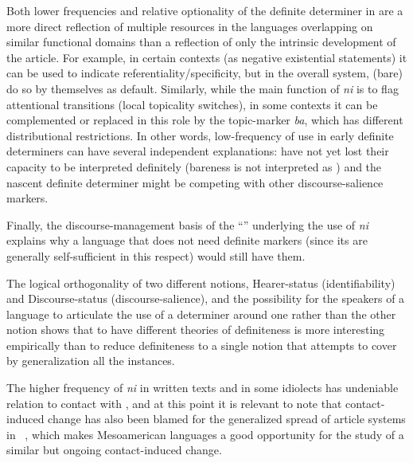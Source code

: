 \documentclass[output=paper
,modfonts
,nonflat]{langsci/langscibook}
\begin{document}
Both lower frequencies and relative optionality of the definite determiner in  are a more direct reflection of multiple resources in the languages overlapping on similar functional domains than a reflection of only the intrinsic development of the article. For example, in certain contexts (as negative existential statements) it can be used to indicate referentiality/specificity, but in the overall system, (bare)  do so by themselves as default. Similarly, while the main function of \textit{ni} is to flag attentional transitions (local topicality switches), in some contexts it can be complemented or replaced in this role by the topic-marker \textit{ba}, which has different distributional restrictions. In other words, low-frequency of use in early definite determiners can have several independent explanations:  have not yet lost their capacity to be interpreted definitely (bareness is not interpreted as ) and the nascent definite determiner might be competing with other discourse-salience markers.

Finally, the discourse-management basis of the ``'' underlying the use of \textit{ni} explains why a language that does not need definite markers (since its  are generally self-sufficient in this respect) would still have them.

The logical orthogonality of two different notions, Hearer-status (identifiability) and Discourse-status (discourse-salience), and the possibility for the speakers of a language to articulate the use of a determiner around one rather than the other notion shows that to have different theories of definiteness is more interesting empirically than to reduce definiteness to a single notion that attempts to cover by generalization all the instances.  

The higher frequency of \textit{ni} in written texts and in some idiolects has undeniable relation to contact with , and at this point it is relevant to note that contact-induced change has also been blamed for the generalized spread of article systems in ~\citep{Schroeder2006}, which makes Mesoamerican languages a good opportunity for the study of a similar but ongoing contact-induced change.
\end{document}
